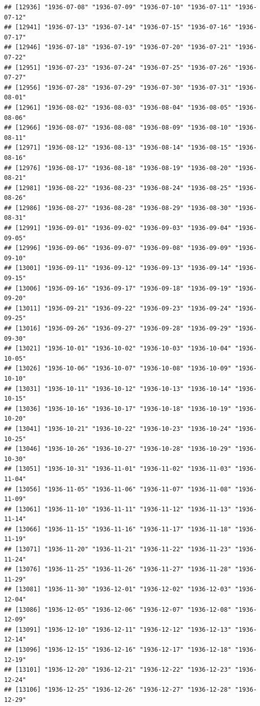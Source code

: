 \documentclass{article}\usepackage[]{graphicx}\usepackage[]{color}
\makeatletter
\newenvironment{kframe}{%
 \def\at@end@of@kframe{}%
 \ifinner\ifhmode%
  \def\at@end@of@kframe{\end{minipage}}%
  \begin{minipage}{\columnwidth}%
 \fi\fi%
 \def\FrameCommand##1{\hskip\@totalleftmargin \hskip-\fboxsep
 \colorbox{shadecolor}{##1}\hskip-\fboxsep
     \hskip-\linewidth \hskip-\@totalleftmargin \hskip\columnwidth}%
 \MakeFramed {\advance\hsize-\width
   \@totalleftmargin\z@ \linewidth\hsize
   \@setminipage}}%
 {\par\unskip\endMakeFramed%
 \at@end@of@kframe}
\newenvironment{knitrout}{}{} %
\makeatother
\begin{document}
\begin{description}
\begin{knitrout}
\begin{kframe}
\begin{verbatim}
## [12936] "1936-07-08" "1936-07-09" "1936-07-10" "1936-07-11" "1936-07-12"
## [12941] "1936-07-13" "1936-07-14" "1936-07-15" "1936-07-16" "1936-07-17"
## [12946] "1936-07-18" "1936-07-19" "1936-07-20" "1936-07-21" "1936-07-22"
## [12951] "1936-07-23" "1936-07-24" "1936-07-25" "1936-07-26" "1936-07-27"
## [12956] "1936-07-28" "1936-07-29" "1936-07-30" "1936-07-31" "1936-08-01"
## [12961] "1936-08-02" "1936-08-03" "1936-08-04" "1936-08-05" "1936-08-06"
## [12966] "1936-08-07" "1936-08-08" "1936-08-09" "1936-08-10" "1936-08-11"
## [12971] "1936-08-12" "1936-08-13" "1936-08-14" "1936-08-15" "1936-08-16"
## [12976] "1936-08-17" "1936-08-18" "1936-08-19" "1936-08-20" "1936-08-21"
## [12981] "1936-08-22" "1936-08-23" "1936-08-24" "1936-08-25" "1936-08-26"
## [12986] "1936-08-27" "1936-08-28" "1936-08-29" "1936-08-30" "1936-08-31"
## [12991] "1936-09-01" "1936-09-02" "1936-09-03" "1936-09-04" "1936-09-05"
## [12996] "1936-09-06" "1936-09-07" "1936-09-08" "1936-09-09" "1936-09-10"
## [13001] "1936-09-11" "1936-09-12" "1936-09-13" "1936-09-14" "1936-09-15"
## [13006] "1936-09-16" "1936-09-17" "1936-09-18" "1936-09-19" "1936-09-20"
## [13011] "1936-09-21" "1936-09-22" "1936-09-23" "1936-09-24" "1936-09-25"
## [13016] "1936-09-26" "1936-09-27" "1936-09-28" "1936-09-29" "1936-09-30"
## [13021] "1936-10-01" "1936-10-02" "1936-10-03" "1936-10-04" "1936-10-05"
## [13026] "1936-10-06" "1936-10-07" "1936-10-08" "1936-10-09" "1936-10-10"
## [13031] "1936-10-11" "1936-10-12" "1936-10-13" "1936-10-14" "1936-10-15"
## [13036] "1936-10-16" "1936-10-17" "1936-10-18" "1936-10-19" "1936-10-20"
## [13041] "1936-10-21" "1936-10-22" "1936-10-23" "1936-10-24" "1936-10-25"
## [13046] "1936-10-26" "1936-10-27" "1936-10-28" "1936-10-29" "1936-10-30"
## [13051] "1936-10-31" "1936-11-01" "1936-11-02" "1936-11-03" "1936-11-04"
## [13056] "1936-11-05" "1936-11-06" "1936-11-07" "1936-11-08" "1936-11-09"
## [13061] "1936-11-10" "1936-11-11" "1936-11-12" "1936-11-13" "1936-11-14"
## [13066] "1936-11-15" "1936-11-16" "1936-11-17" "1936-11-18" "1936-11-19"
## [13071] "1936-11-20" "1936-11-21" "1936-11-22" "1936-11-23" "1936-11-24"
## [13076] "1936-11-25" "1936-11-26" "1936-11-27" "1936-11-28" "1936-11-29"
## [13081] "1936-11-30" "1936-12-01" "1936-12-02" "1936-12-03" "1936-12-04"
## [13086] "1936-12-05" "1936-12-06" "1936-12-07" "1936-12-08" "1936-12-09"
## [13091] "1936-12-10" "1936-12-11" "1936-12-12" "1936-12-13" "1936-12-14"
## [13096] "1936-12-15" "1936-12-16" "1936-12-17" "1936-12-18" "1936-12-19"
## [13101] "1936-12-20" "1936-12-21" "1936-12-22" "1936-12-23" "1936-12-24"
## [13106] "1936-12-25" "1936-12-26" "1936-12-27" "1936-12-28" "1936-12-29"

\end{verbatim}
\end{kframe}
\end{knitrout}
\end{description}
\end{document}
